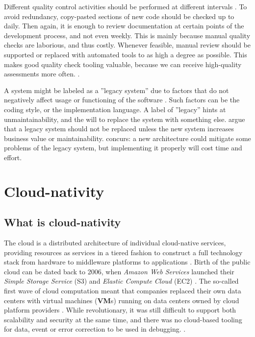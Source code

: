\documentclass[utf8,english]{gradu3}
\begin{document}
Different quality control activities should be performed at different intervals
\parencite[25]{Broy2006}. To avoid redundancy, copy-pasted sections of new code
should be checked up to daily. Then again, it is enough to review documentation
at certain points of the development process, and not even weekly. This is
mainly because manual quality checks are laborious, and thus costly. Whenever
feasible, manual review should be supported or replaced with automated tools to
as high a degree as possible. This makes good quality check tooling valuable,
because we can receive high-quality assessments more often.
\parencite[25]{Broy2006}.

A system might be labeled as a ''legacy system'' due to factors that do not
negatively affect usage or functioning of the software \parencite[22]{Broy2006}.
Such factors can be the coding style, or the implementation language. A label of
''legacy'' hints at unmaintainability, and the will to replace the system with
something else. \textcite[22]{Broy2006} argue that a legacy system should not be
replaced unless the new system increases business value or maintainability.
\textcite[18]{Li2021} concurs: a new architecture could mitigate some problems
of the legacy system, but implementing it properly will cost time and effort.


\section{Cloud-nativity}

\subsection{What is cloud-nativity}

The cloud is a distributed architecture of individual cloud-native services,
providing resources as services in a tiered fashion to construct a full
technology stack from hardware to middleware platforms to applications \parencite[1]{Pahl2018}.
Birth of the public cloud can be dated back to 2006, when \textit{Amazon Web
  Services} launched their \textit{Simple Storage Service} (S3) and
\textit{Elastic Compute Cloud} (EC2) \parencite[1]{Kratzke2017}. The so-called
first wave of cloud computation meant that companies replaced their own data
centers with virtual machines (\textbf{VM}s) running on data centers owned by cloud platform
providers \parencite[17]{Gannon2017}. While revolutionary, it was still
difficult to support both scalability and security at the same time, and there
was no cloud-based tooling for data, event or error correction to be used in
debugging. \parencite[18]{Gannon2017}.
\end{document}
